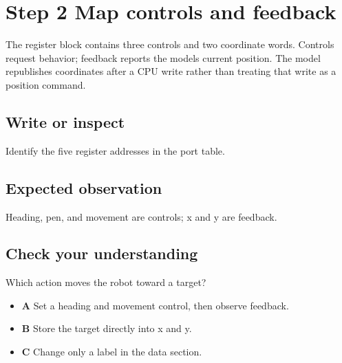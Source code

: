\section{Step 2 Map controls and
  feedback}\label{006-marsbot-square-s02-step-2-map-controls-and-feedback}

The register block contains three controls and two coordinate words.
Controls request behavior; feedback reports the model\textquotesingle s
current position. The model republishes coordinates after a CPU write
rather than treating that write as a position command.

\subsection{Write or
  inspect}\label{006-marsbot-square-s02-write-or-inspect}

Identify the five register addresses in the port table.

\subsection{Expected
  observation}\label{006-marsbot-square-s02-expected-observation}

Heading, pen, and movement are controls; x and y are feedback.

\subsection{Check your
  understanding}\label{006-marsbot-square-s02-check-your-understanding}

Which action moves the robot toward a target?

\begin{itemize}
  \tightlist
  \item
        \textbf{A} Set a heading and movement control, then observe feedback.
  \item
        \textbf{B} Store the target directly into x and y.
  \item
        \textbf{C} Change only a label in the data section.
\end{itemize}
